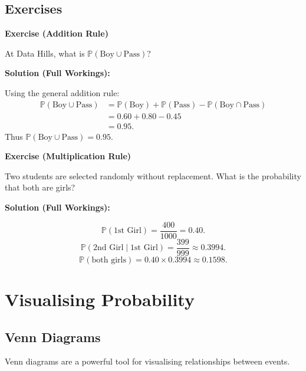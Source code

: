 \documentclass[12pt,a4paper,oneside]{report}
\theoremstyle{mytheorem}
\theoremstyle{mydefinition}
\theoremstyle{myremark}
\newenvironment{exercise}[1]{%
  \par\medskip\noindent\textbf{\color{myblue}Exercise (#1)}\par\smallskip
}{%
  \par\smallskip
}
\newenvironment{solution}{%
  \par\noindent\textbf{\color{mygreen}Solution (Full Workings):}\par\smallskip
}{%
  \par\bigskip
}
\newcommand{\Prob}{\mathbb{P}}
\begin{document}
\section{Exercises}
\begin{exercise}{Addition Rule}
At Data Hills, what is $\Prob(\text{Boy} \cup \text{Pass})$?
\end{exercise}
\begin{solution}
Using the general addition rule:
\begin{align*}
\Prob(\text{Boy}\cup\text{Pass})
&= \Prob(\text{Boy}) + \Prob(\text{Pass}) - \Prob(\text{Boy}\cap\text{Pass}) \\
&= 0.60 + 0.80 - 0.45 \\
&= 0.95.
\end{align*}
Thus $\boxed{\Prob(\text{Boy}\cup\text{Pass}) = 0.95}$.
\end{solution}

\begin{exercise}{Multiplication Rule}
Two students are selected randomly without replacement. What is the probability that both are girls?
\end{exercise}
\begin{solution}
\[
\Prob(\text{1st Girl}) = \frac{400}{1000} = 0.40.
\]
\[
\Prob(\text{2nd Girl} \mid \text{1st Girl}) = \frac{399}{999} \approx 0.3994.
\]
\[
\Prob(\text{both girls}) = 0.40 \times 0.3994 \approx 0.1598.
\]
\end{solution}

\chapter{Visualising Probability}

\section{Venn Diagrams}
Venn diagrams are a powerful tool for visualising relationships between events.
\end{document}
